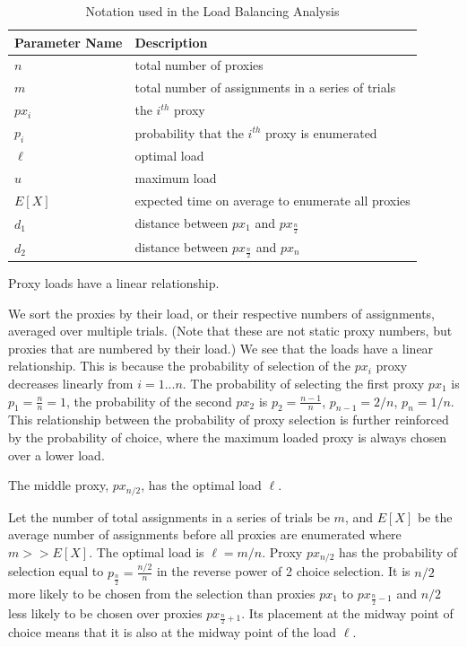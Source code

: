\begin{table}[h]
  \centering
	\begin{tabular}{ll}
	\hline
	\cline{1-2}
	Parameter Name    & Description  \\
	\hline
    $n$     & total number of proxies \\
    $m$     & total number of assignments in a series of trials \\
    $px_i$  & the $i^{th}$ proxy \\
    $p_i$   & probability that the $i^{th}$ proxy is enumerated \\
	$\ell$     & optimal load \\
	$u$     & maximum load \\
    $E[X]$  & expected time on average to enumerate all proxies \\
    $d_1$ & distance between $px_1$ and $px_{\frac{n}{2}}$ \\
    $d_2$ & distance between $px_{\frac{n}{2}}$ and $px_n$ \\
	\hline
	\end{tabular}
  \caption{Notation used in the Load Balancing Analysis}
  \label{tab:vars}
\end{table}

\begin{lemma}{Proxy loads have a linear relationship.}

We sort the proxies by their load, or their respective numbers of assignments, averaged over multiple trials. (Note that these are not static proxy numbers, but proxies that are numbered by their load.) We see that the loads have a linear relationship. This is because the probability of selection of the $px_i$ proxy decreases linearly from $i=1...n$. The probability of selecting the first proxy $px_1$ is $p_1=\frac{n}{n}=1$, the probability of the second $px_2$ is $p_2=\frac{n-1}{n}$, $p_{n-1}=2/n$, $p_{n}=1/n$. This relationship between the probability of proxy selection is further reinforced by the probability of choice, where the maximum loaded proxy is always chosen over a lower load.
\end{lemma}

\begin{lemma}{The middle proxy, $px_{n/2}$, has the optimal load $\ell$.}

Let the number of total assignments in a series of trials be $m$, and $E[X]$ be the average number of assignments before all proxies are enumerated where $m>>E[X]$. The optimal load is $\ell=m/n$. Proxy $px_{n/2}$ has the probability of selection equal to $p_{\frac{n}{2}}=\frac{n/2}{n}$ in the reverse power of 2 choice selection. It is $n/2$ more likely to be chosen from the selection than proxies $px_1$ to $px_{\frac{n}{2} - 1}$ and $n/2$ less likely to be chosen over proxies $px_{\frac{n}{2} + 1}$. Its placement at the midway point of choice means that it is also at the midway point of the load $\ell$. 
\end{lemma}

